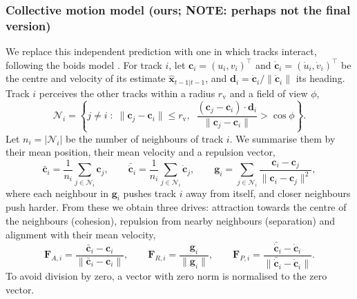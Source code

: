 \documentclass[9pt,twoside]{pnas-new}
\begin{document}
\subsubsection*{Collective motion model (ours; NOTE: perhaps not the final version)}
We replace this independent prediction with one in which tracks interact, following the boids model \cite{reynolds, reynolds1999}. For track $i$, let $\mathbf{c}_i = (u_i, v_i)^\top$ and $\dot{\mathbf{c}}_i = (\dot u_i, \dot v_i)^\top$ be the centre and velocity of its estimate $\hat{\mathbf{x}}_{t-1|t-1}$, and $\mathbf{d}_i = \dot{\mathbf{c}}_i / \lVert \dot{\mathbf{c}}_i \rVert$ its heading.
Track $i$ perceives the other tracks within a radius $r_\mathrm{v}$ and a field of view $\phi$,
\begin{equation}
  \mathcal{N}_i = \left\{ j \neq i \;:\; \lVert \mathbf{c}_j - \mathbf{c}_i \rVert \le r_\mathrm{v},\;\;
  \frac{(\mathbf{c}_j - \mathbf{c}_i) \cdot \mathbf{d}_i}{\lVert \mathbf{c}_j - \mathbf{c}_i \rVert} > \cos\phi \right\}.
  \label{eq:neighbours}
\end{equation}
Let $n_i = |\mathcal{N}_i|$ be the number of neighbours of track $i$. 
We summarise them by their mean position, their mean velocity and a repulsion vector,
\begin{equation*}
  \bar{\mathbf{c}}_i = \frac{1}{n_i}\sum_{j \in \mathcal{N}_i} \mathbf{c}_j, \qquad
  \bar{\dot{\mathbf{c}}}_i = \frac{1}{n_i}\sum_{j \in \mathcal{N}_i} \dot{\mathbf{c}}_j, \qquad
  \mathbf{g}_i = \sum_{j \in \mathcal{N}_i} \frac{\mathbf{c}_i - \mathbf{c}_j}{\lVert \mathbf{c}_i - \mathbf{c}_j \rVert^2},
\end{equation*}
where each neighbour in $\mathbf{g}_i$ pushes track $i$ away from itself, and closer neighbours push harder. 
From these we obtain three drives: attraction towards the centre of the neighbours (cohesion), repulsion from nearby neighbours (separation) and alignment with their mean velocity,
\begin{equation}
  \mathbf{F}_{A,i} = \frac{\bar{\mathbf{c}}_i - \mathbf{c}_i}{\lVert \bar{\mathbf{c}}_i - \mathbf{c}_i \rVert}, \qquad
  \mathbf{F}_{R,i} = \frac{\mathbf{g}_i}{\lVert \mathbf{g}_i \rVert}, \qquad
  \mathbf{F}_{P,i} = \frac{\bar{\dot{\mathbf{c}}}_i - \dot{\mathbf{c}}_i}{\lVert \bar{\dot{\mathbf{c}}}_i - \dot{\mathbf{c}}_i \rVert}.
  \label{eq:drives}
\end{equation}
To avoid division by zero, a vector with zero norm is normalised to the zero vector.
\end{document}
